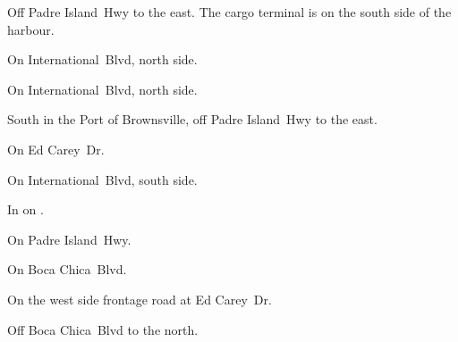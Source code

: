 
\begin{LocationList}

Off  Padre Island~Hwy to the east.
The cargo terminal is on the south side of the harbour.

On  International~Blvd, north side.

On  International~Blvd, north side.

South in the Port of Brownsville, off  Padre Island~Hwy to the east.

On  Ed Carey~Dr.

On  International~Blvd, south side.

In  on .

On  Padre Island~Hwy.

\Location{\TruckService \Service}
On  Boca Chica~Blvd.

\Location{\TruckStop \Gas \Rest}
On the west side  frontage road at  Ed Carey~Dr.

Off  Boca Chica~Blvd to the north.

\end{LocationList}
